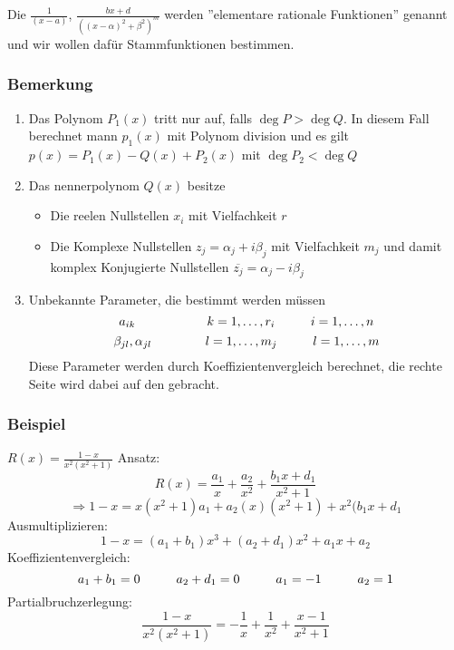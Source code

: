 Die $\frac{1}{(x-a)}$, $\frac{bx+d}{\left( (x-\alpha )^2 +\beta ^2\right)^m}$ werden ''elementare rationale Funktionen'' genannt und wir wollen dafür Stammfunktionen bestimmen.

\subsubsection*{Bemerkung}

\begin{enumerate}
\item Das Polynom $P_1(x)$ tritt nur auf, falls $\deg P>\deg Q$. In diesem Fall berechnet mann $p_1(x)$ mit Polynom division und es gilt $p(x)=P_1(x)-Q(x)+P_2(x)$ mit $\deg P_2 < \deg Q$
\item Das nennerpolynom $Q(x)$ besitze
\begin{itemize}
\item Die reelen Nullstellen $x_i$ mit Vielfachkeit $r$
\item Die Komplexe Nullstellen $z_j=\alpha _j+i\beta_j$ mit Vielfachkeit $m_j$ und damit komplex Konjugierte Nullstellen $\overline{z_j}=\alpha _j-i\beta _j$
\end{itemize}
\item Unbekannte Parameter, die bestimmt werden müssen
$$a_{ik}\text{\hspace{20mm}}k=1,\dots ,r_i\text{\hspace{10mm}}i=1,\dots,n$$
$$\beta _{jl},\alpha _{jl}\text{\hspace{15mm}}l=1,\dots ,m_j\text{\hspace{10mm}}l=1,\dots,m$$
Diese Parameter werden durch Koeffizientenvergleich berechnet, die rechte Seite wird dabei auf den  gebracht.
\end{enumerate}
\subsubsection{Beispiel}
$R(x)=\frac{1-x}{x^2(x^2+1)}$
Ansatz: $$R(x)=\frac{a_1}{x}+\frac{a_2}{x^2}+\frac{b_1x+d_1}{x^2+1}$$$$\Rightarrow 1-x=x(x^2+1)a_1+a_2(x)(x^2+1)+x^2(b_1x+d_1$$
Ausmultiplizieren:
$$1-x=(a_1+b_1)x^3+(a_2+d_1)x^2+a_1x+a_2$$
Koeffizientenvergleich:
$$a_1+b_1=0\text{\hspace{10mm}}a_2+d_1=0\text{\hspace{10mm}}a_1=-1\text{\hspace{10mm}}a_2=1$$
Partialbruchzerlegung:
$$\frac{1-x}{x^2(x^2+1)}=-\frac{1}{x}+\frac{1}{x^2}+\frac{x-1}{x^2+1}$$
